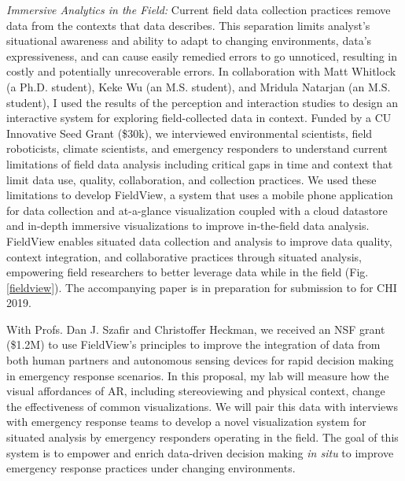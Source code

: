 \documentclass[11pt]{article}
\begin{document}
\emph{Immersive Analytics in the Field:} Current field data collection practices remove data from the contexts that data describes. This separation limits analyst's situational awareness and ability to adapt to changing environments, data's expressiveness, and can cause easily remedied errors to go unnoticed, resulting in costly and potentially unrecoverable errors. In collaboration with Matt Whitlock (a Ph.D. student), Keke Wu (an M.S. student), and Mridula Natarjan (an M.S. student), I used the results of the perception and interaction studies to design an interactive system for exploring field-collected data in context. Funded by a CU Innovative Seed Grant (\$30k), we interviewed environmental scientists, field roboticists, climate scientists, and emergency responders to understand current limitations of field data analysis including critical gaps in time and context that limit data use, quality, collaboration, and collection practices. We used these limitations to develop FieldView, a system that uses a mobile phone application for data collection and at-a-glance visualization coupled with a cloud datastore and in-depth immersive visualizations to improve in-the-field data analysis. 
FieldView enables situated data collection and analysis to improve data quality, context integration, and collaborative practices through situated analysis, empowering field researchers to better leverage data while in the field (Fig. \ref{fieldview}). The accompanying paper is in preparation for submission to for CHI 2019. 

With Profs. Dan J. Szafir and Christoffer Heckman, we received an NSF grant (\$1.2M) to use FieldView's principles to improve the integration of data from both human partners and autonomous sensing devices for rapid decision making in emergency response scenarios. In this proposal, my lab will measure how the visual affordances of AR, including stereoviewing and physical context, change the effectiveness of common visualizations. We will pair this data with interviews with emergency response teams to develop a novel visualization system for situated analysis by emergency responders operating in the field. The goal of this system is to empower and enrich data-driven decision making \emph{in situ} to improve emergency response practices under changing environments. 
\end{document}
